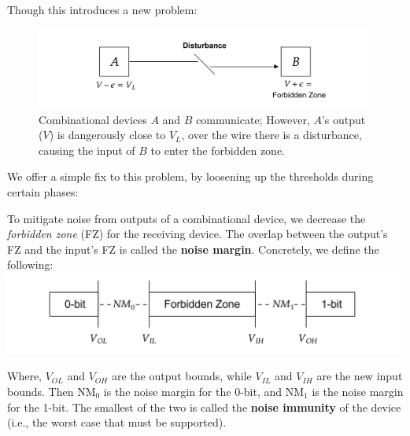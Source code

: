     \noindent
    Though this introduces a new problem:
    \begin{figure}[ht!]

        \centering
        \includegraphics[width=.82\textwidth]{./Sections/circuits/combin_noise.png}
        \caption{Combinational devices $A$ and $B$ communicate; However, $A$'s output ($V$) is dangerously close 
        to $V_{L}$, over the wire there is a disturbance, causing the input of $B$ to enter the forbidden zone.}
        \label{fig:combinational_digital_systems_cycle}
    \end{figure}

    \newpage 

    \noindent
    We offer a simple fix to this problem, by loosening up the thresholds during certain phases:

    \begin{Def}

        \noindent
        To mitigate noise from outputs of a combinational device, we decrease the \emph{forbidden zone} (FZ) for the 
        receiving device. The overlap between the output's FZ and the input's FZ is called the \textbf{noise margin}.
        Concretely, we define the following:\\

        \noindent
        \includegraphics[width=\textwidth]{./Sections/circuits/noise_margin.png}

        \noindent
        Where, $V_{OL}$ and $V_{OH}$ are the output bounds, while $V_{IL}$ and $V_{IH}$ are the new input bounds.
        Then $\mathrm{NM}_0$ is the noise margin for the 0-bit, and $\mathrm{NM}_1$ is the noise margin for the 1-bit. The smallest 
        of the two is called the \textbf{noise immunity} of the device (i.e., the worst case that must be supported).
    \end{Def}


